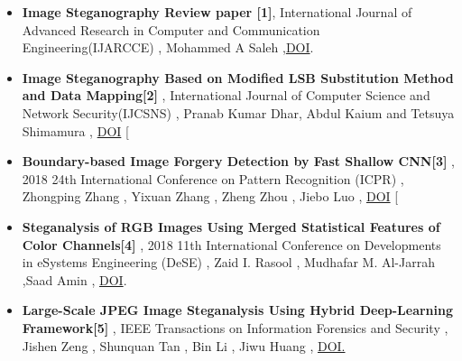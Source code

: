 \documentclass{beamer} %
\theoremstyle{definition} %
\begin{document}
\begin{itemize}
	\item{\textbf{Image Steganography Review paper [1]}, International Journal of Advanced Research in Computer and Communication Engineering(IJARCCE) , Mohammed A  Saleh ,\href{https://ijarcce.com/wp-content/uploads/2018/10/IJARCCE.2018.7910.pdf} {DOI}. }
\end{itemize}

\begin{itemize}
	\item{\textbf{Image Steganography Based on Modified LSB Substitution Method and Data Mapping[2]} ,   International Journal of Computer Science and Network Security(IJCSNS) , Pranab Kumar Dhar, Abdul Kaium and Tetsuya Shimamura , \href{http://paper.ijcsns.org/07_book/201803/20180321.pdf}{DOI} [ }
	\end{itemize}
\begin{itemize}
	\item{\textbf{Boundary-based Image Forgery Detection by Fast Shallow CNN[3]} , 2018 24th International Conference on Pattern Recognition (ICPR) , Zhongping Zhang , Yixuan Zhang , Zheng Zhou , Jiebo Luo , \href{https://doi.org/10.1109/ICPR.2018.8545074} {DOI} [  }

\end{itemize}

\begin{itemize}
	\item {\textbf{Steganalysis of RGB Images Using Merged Statistical Features of Color Channels[4]} , 2018 11th International Conference on Developments in eSystems Engineering (DeSE) , Zaid I.  Rasool , Mudhafar M.  Al-Jarrah ,Saad Amin , \href{https://doi.org/10.1109/DeSE.2018.00048}{DOI}. }
\end{itemize}
\begin{itemize}
	\item {\textbf{Large-Scale JPEG Image Steganalysis Using
			Hybrid Deep-Learning Framework[5]} ,  IEEE Transactions on Information Forensics and Security , Jishen Zeng  , Shunquan Tan  , Bin Li , Jiwu Huang , \href{https://doi.org/10.1109/TIFS.2017.2779446}{DOI. } }
\end{itemize}
\end{document}
